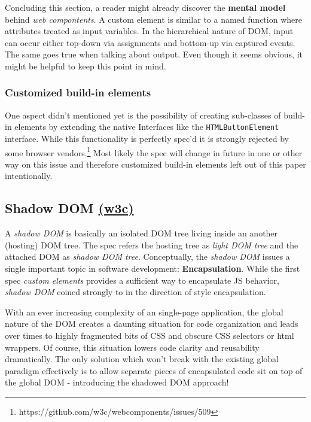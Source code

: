 \documentclass[]{article}
\begin{document}
Concluding this section, a reader might already discover the
\textbf{mental model} behind \emph{web compontents}. A custom element is
similar to a named function where attributes treated as input variables.
In the hierarchical nature of DOM, input can occur either top-down via
assignments and bottom-up via captured events. The same goes true when
talking about output. Even though it seems obvious, it might be helpful
to keep this point in mind.

\subsubsection{Customized build-in
elements}\label{customized-build-in-elements}

One aspect didn't mentioned yet is the possibility of creating
sub-classes of build-in elements by extending the native Interfaces like
the \texttt{HTMLButtonElement} interface. While this functionality is
perfectly spec'd it is strongly rejected by some browser
vendors.\footnote{https://github.com/w3c/webcomponents/issues/509} Most
likely the spec will change in future in one or other way on this issue
and therefore customized build-in elements left out of this paper
intentionally.

\subsection{\texorpdfstring{Shadow DOM
\href{http://w3c.github.io/webcomponents/spec/shadow/}{(w3c)}}{Shadow DOM (w3c)}}\label{shadow-dom-w3c}

A \emph{shadow DOM} is basically an isolated DOM tree living inside an
another (hosting) DOM tree. The spec refers the hosting tree as
\emph{light DOM tree} and the attached DOM as \emph{shadow DOM tree}.
Conceptually, the \emph{shadow DOM} issues a single important topic in
software development: \textbf{Encapsulation}. While the first spec
\emph{custom elements} provides a sufficient way to encapsulate JS
behavior, \emph{shadow DOM} coined strongly to in the direction of style
encapsulation.

With an ever increasing complexity of an single-page application, the
global nature of the DOM creates a daunting situation for code
organization and leads over times to highly fragmented bits of CSS and
obscure CSS selectors or html wrappers. Of course, this situation lowers
code clarity and reusability dramatically. The only solution which won't
break with the existing global paradigm effectively is to allow separate
pieces of encapsulated code sit on top of the global DOM - introducing
the shadowed DOM approach!
\end{document}
